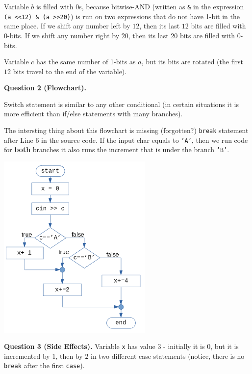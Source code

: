 \documentclass[11pt]{article}
\begin{document}
Variable $b$ is filled with 0s, because bitwise-AND 
(written as {\tt \&} in the expression {\tt (a \textless\textless 12) \& (a \textgreater\textgreater 20)}) is run on two expressions that do not 
have 1-bit in the same place. If we shift any number left by $12$, 
then its last $12$ bits are filled with 0-bits. 
If we shift any number right by $20$, then its last $20$ bits are 
filled with 0-bits. 

Variable $c$ has the same number of 1-bits as $a$, but its bits are rotated
(the first $12$ bits travel to the end of the variable).

\vspace{20pt}
{\bf Question 2 (Flowchart).} 

Switch statement is similar to any other conditional (in certain 
situations it is more efficient than if/else statements with many branches). 

The intersting thing about this flowchart is missing (forgotten?) {\tt break}
statement after Line 6 in the source code. If the input char equals to {\tt 'A'}, 
then we run code for {\bf both} branches \textendash 
it also runs the increment that is under the branch {\tt 'B'}. 

\includegraphics[width=3in]{assignment01-expr-control/assignment01-flowchart.png}

\vspace{20pt}
{\bf Question 3 (Side Effects).} Variable {\tt x} 
has value $3$ - initially it is $0$, but it is incremented by $1$, then by $2$
in two different case statements (notice, there is no {\tt break} after the 
first {\tt case}).
\end{document}
